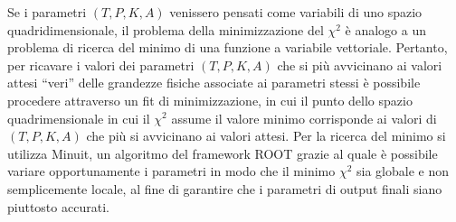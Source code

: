 \documentclass[12pt,a4paper,twoside]{report}
\begin{document}
	Se i parametri $\left(T,P,K,A\right)$ venissero pensati come variabili di uno spazio quadridimensionale, il problema della minimizzazione del $\chi^2$ è analogo a un problema di ricerca del minimo di una funzione a variabile vettoriale. Pertanto, per ricavare i valori dei parametri $\left(T,P,K,A\right)$ che si più avvicinano ai valori attesi ``veri'' delle grandezze fisiche associate ai parametri stessi è possibile procedere attraverso un fit di minimizzazione, in cui il punto dello spazio quadrimensionale in cui il $\chi^2$ assume il valore minimo corrisponde ai valori di $\left(T,P,K,A\right)$ che più si avvicinano ai valori attesi. Per la ricerca del minimo si utilizza Minuit, un algoritmo del framework ROOT grazie al quale è possibile variare opportunamente i parametri in modo che il minimo $\chi^2$ sia globale e non semplicemente locale, al fine di garantire che i parametri di output finali siano piuttosto accurati.
	
\end{document}
